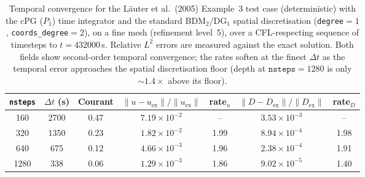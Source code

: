 \begin{table}[htbp]
  \centering
  \begin{tabular}{c c c c c c c}
    \toprule
    \texttt{nsteps} & $\Delta t$ (s) & Courant
      & $\|u-u_{\mathrm{ex}}\|/\|u_{\mathrm{ex}}\|$ & rate$_u$
      & $\|D-D_{\mathrm{ex}}\|/\|D_{\mathrm{ex}}\|$ & rate$_D$ \\
    \midrule
     160 & 2700 & 0.47 & $7.19\times10^{-2}$ & --   & $3.53\times10^{-3}$ & --   \\
     320 & 1350 & 0.23 & $1.82\times10^{-2}$ & 1.99 & $8.94\times10^{-4}$ & 1.98 \\
     640 &  675 & 0.12 & $4.66\times10^{-3}$ & 1.96 & $2.38\times10^{-4}$ & 1.91 \\
    1280 &  338 & 0.06 & $1.29\times10^{-3}$ & 1.86 & $9.02\times10^{-5}$ & 1.40 \\
    \bottomrule
  \end{tabular}
  \caption{Temporal convergence for the Läuter et al.\ (2005) Example~3 test case
    (deterministic) with the cPG ($P_1$) time integrator and the standard BDM$_2$/DG$_1$
    spatial discretisation (\texttt{degree}$=1$, \texttt{coords\_degree}$=2$), on a fine
    mesh (refinement level~5), over a CFL-respecting sequence of timesteps to
    $t = 432000$\,s. Relative $L^2$ errors are measured against the exact solution.
    Both fields show second-order temporal convergence; the rates soften at the finest
    $\Delta t$ as the temporal error approaches the spatial discretisation floor
    (depth at $\texttt{nsteps}=1280$ is only $\sim 1.4\times$ above its floor).}
  \label{tab:lauter-temporal-coords2}
\end{table}
